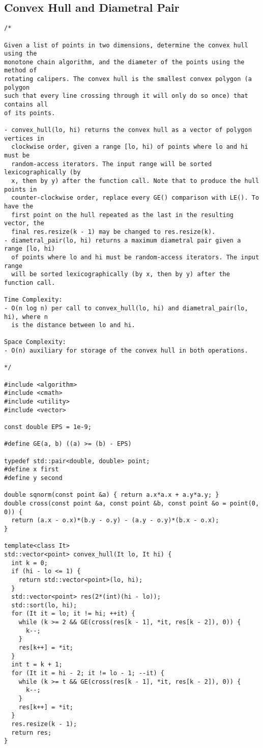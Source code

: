 \subsection{Convex Hull and Diametral Pair}
\begin{lstlisting}
/*

Given a list of points in two dimensions, determine the convex hull using the
monotone chain algorithm, and the diameter of the points using the method of
rotating calipers. The convex hull is the smallest convex polygon (a polygon
such that every line crossing through it will only do so once) that contains all
of its points.

- convex_hull(lo, hi) returns the convex hull as a vector of polygon vertices in
  clockwise order, given a range [lo, hi) of points where lo and hi must be
  random-access iterators. The input range will be sorted lexicographically (by
  x, then by y) after the function call. Note that to produce the hull points in
  counter-clockwise order, replace every GE() comparison with LE(). To have the
  first point on the hull repeated as the last in the resulting vector, the
  final res.resize(k - 1) may be changed to res.resize(k).
- diametral_pair(lo, hi) returns a maximum diametral pair given a range [lo, hi)
  of points where lo and hi must be random-access iterators. The input range
  will be sorted lexicographically (by x, then by y) after the function call.

Time Complexity:
- O(n log n) per call to convex_hull(lo, hi) and diametral_pair(lo, hi), where n
  is the distance between lo and hi.

Space Complexity:
- O(n) auxiliary for storage of the convex hull in both operations.

*/

#include <algorithm>
#include <cmath>
#include <utility>
#include <vector>

const double EPS = 1e-9;

#define GE(a, b) ((a) >= (b) - EPS)

typedef std::pair<double, double> point;
#define x first
#define y second

double sqnorm(const point &a) { return a.x*a.x + a.y*a.y; }
double cross(const point &a, const point &b, const point &o = point(0, 0)) {
  return (a.x - o.x)*(b.y - o.y) - (a.y - o.y)*(b.x - o.x);
}

template<class It>
std::vector<point> convex_hull(It lo, It hi) {
  int k = 0;
  if (hi - lo <= 1) {
    return std::vector<point>(lo, hi);
  }
  std::vector<point> res(2*(int)(hi - lo));
  std::sort(lo, hi);
  for (It it = lo; it != hi; ++it) {
    while (k >= 2 && GE(cross(res[k - 1], *it, res[k - 2]), 0)) {
      k--;
    }
    res[k++] = *it;
  }
  int t = k + 1;
  for (It it = hi - 2; it != lo - 1; --it) {
    while (k >= t && GE(cross(res[k - 1], *it, res[k - 2]), 0)) {
      k--;
    }
    res[k++] = *it;
  }
  res.resize(k - 1);
  return res;
}


\end{lstlisting}
